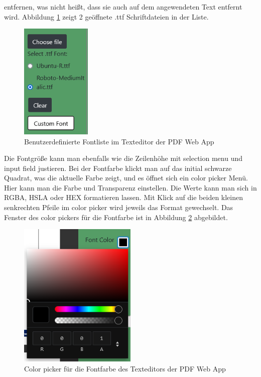 entfernen, was nicht heißt, dass sie auch auf dem angewendeten Text entfernt wird. Abbildung \ref{fig:custom-font} zeigt 2 geöffnete .ttf Schriftdateien in der Liste.

\begin{figure}[!htbp]
	\centering
	\includegraphics[width=0.3\textwidth]{"images/custom-font.png"}
	\caption{Benutzerdefinierte Fontliste im Texteditor der PDF Web App}
	\label{fig:custom-font}
\end{figure}

Die Fontgröße kann man ebenfalls wie die Zeilenhöhe mit selection menu und input field justieren. Bei der Fontfarbe klickt man auf das initial schwarze Quadrat, was die aktuelle Farbe zeigt, und es öffnet sich ein color picker Menü. Hier kann man die Farbe und Transparenz einstellen. Die Werte kann man sich in RGBA, HSLA oder HEX formatieren lassen. Mit Klick auf die beiden kleinen senkrechten Pfeile im color picker wird jeweils das Format gewechselt. Das Fenster des color pickers für die Fontfarbe ist in Abbildung \ref{fig:fontcolor} abgebildet. 

\begin{figure}[!htbp]
	\centering
	\includegraphics[width=0.5\textwidth]{"images/fontcolor.png"}
	\caption{Color picker für die Fontfarbe des Texteditors der PDF Web App}
	\label{fig:fontcolor}
\end{figure}

